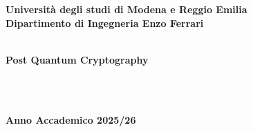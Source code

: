 \documentclass[12pt,a4paper,oneside,onecolumn,openright]{book}
\begin{document}
\begin{titlepage}
\begin{center}
{
    \large
    \textbf{Università  degli studi di Modena e Reggio Emilia} \\
   	\textbf{Dipartimento di Ingegneria Enzo Ferrari} \\
    \hspace*{0cm} \hrulefill \hspace*{0cm} \\
  
  
 		\huge{\bf Post Quantum Cryptography }}\\
		\vspace{3mm}
		
		\end{center}
		
\vspace{40mm}
\par
\noindent
\vspace{20mm}
\begin{center}
\hspace*{0cm} \hrulefill \hspace*{0cm} \\
{\large{\bf 
Anno Accademico 2025/26}}
\end{center}

\end{titlepage}

\pagestyle{frontmatter}
\frontmatter

\setcounter{tocdepth}{2}
\tableofcontents

\setlength{\parindent}{12pt}
\setlength{\parskip}{1ex plus 0.5ex minus 0.2ex}
\mainmatter
\pagestyle{mainmatter}








\begin{flushleft}

 
\end{flushleft}
\end{document}
